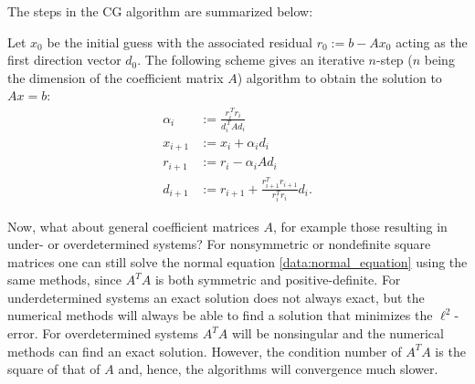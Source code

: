     The steps in the CG algorithm are summarized below:
    \begin{method}
        Let $x_0$ be the initial guess with the associated residual $r_0:=b-Ax_0$ acting as the first direction vector $d_0$. The following scheme gives an iterative $n$-step ($n$ being the dimension of the coefficient matrix $A$) algorithm to obtain the solution to $Ax=b$:
        \begin{align}
            \alpha_i &:= \frac{r_i^{\,T}r_i}{d_i^{\,T}\!Ad_i}\\
            x_{i+1} &:= x_i+\alpha_id_i\\
            r_{i+1} &:= r_i-\alpha_iAd_i\label{data:residual_recurrence}\\
            d_{i+1} &:= r_{i+1}+\frac{r_{i+1}^Tr_{i+1}}{r_i^Tr_i}d_i.\label{data:beta}
        \end{align}
    \end{method}


    Now, what about general coefficient matrices $A$, for example those resulting in under- or overdetermined systems? For nonsymmetric or nondefinite square matrices one can still solve the normal equation \eqref{data:normal_equation} using the same methods, since $A^T\!A$ is both symmetric and positive-definite. For underdetermined systems an exact solution does not always exact, but the numerical methods will always be able to find a solution that minimizes the $\ell^2$-error. For overdetermined systems $A^T\!A$ will be nonsingular and the numerical methods can find an exact solution. However, the condition number of $A^T\!A$ is the square of that of $A$ and, hence, the algorithms will convergence much slower.

